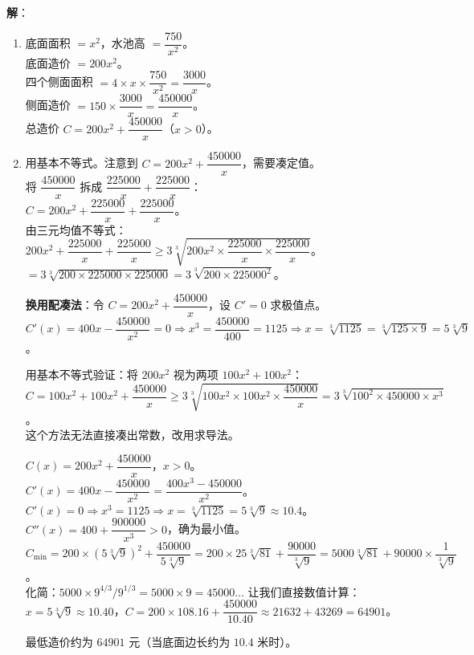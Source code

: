 \documentclass[12pt, a4paper]{ctexart}
\begin{document}
\textbf{解}：
\begin{enumerate}[label=(\arabic*)]
  \item 底面面积 $= x^2$，水池高 $= \dfrac{750}{x^2}$。\\
    底面造价 $= 200x^2$。\\
    四个侧面面积 $= 4 \times x \times \dfrac{750}{x^2} = \dfrac{3000}{x}$。\\
    侧面造价 $= 150 \times \dfrac{3000}{x} = \dfrac{450000}{x}$。\\
    总造价 $C = 200x^2 + \dfrac{450000}{x}$（$x > 0$）。
  \item 用基本不等式。注意到 $C = 200x^2 + \dfrac{450000}{x}$，需要凑定值。\\
    将 $\dfrac{450000}{x}$ 拆成 $\dfrac{225000}{x} + \dfrac{225000}{x}$：\\
    $C = 200x^2 + \dfrac{225000}{x} + \dfrac{225000}{x}$。\\
    由三元均值不等式：$200x^2 + \dfrac{225000}{x} + \dfrac{225000}{x} \geq 3\sqrt[3]{200x^2 \times \dfrac{225000}{x} \times \dfrac{225000}{x}}$。\\
    $= 3\sqrt[3]{200 \times 225000 \times 225000} = 3\sqrt[3]{200 \times 225000^2}$。

    \textbf{换用配凑法}：令 $C = 200x^2 + \dfrac{450000}{x}$，设 $C' = 0$ 求极值点。\\
    $C'(x) = 400x - \dfrac{450000}{x^2} = 0 \Rightarrow x^3 = \dfrac{450000}{400} = 1125 \Rightarrow x = \sqrt[3]{1125} = \sqrt[3]{125 \times 9} = 5\sqrt[3]{9}$。

    用基本不等式验证：将 $200x^2$ 视为两项 $100x^2 + 100x^2$：\\
    $C = 100x^2 + 100x^2 + \dfrac{450000}{x} \geq 3\sqrt[3]{100x^2 \times 100x^2 \times \dfrac{450000}{x}} = 3\sqrt[3]{100^2 \times 450000 \times x^3}$。\\
    这个方法无法直接凑出常数，改用求导法。

    $C(x) = 200x^2 + \dfrac{450000}{x}$，$x > 0$。\\
    $C'(x) = 400x - \dfrac{450000}{x^2} = \dfrac{400x^3 - 450000}{x^2}$。\\
    $C'(x) = 0 \Rightarrow x^3 = 1125 \Rightarrow x = \sqrt[3]{1125} = 5\sqrt[3]{9} \approx 10.4$。\\
    $C''(x) = 400 + \dfrac{900000}{x^3} > 0$，确为最小值。\\
    $C_{\min} = 200 \times (5\sqrt[3]{9})^2 + \dfrac{450000}{5\sqrt[3]{9}} = 200 \times 25\sqrt[3]{81} + \dfrac{90000}{\sqrt[3]{9}} = 5000\sqrt[3]{81} + 90000 \times \dfrac{1}{\sqrt[3]{9}}$。\\
    化简：$5000 \times 9^{4/3}/9^{1/3} = 5000 \times 9 = 45000$... 让我们直接数值计算：\\
    $x = 5\sqrt[3]{9} \approx 10.40$，$C = 200 \times 108.16 + \dfrac{450000}{10.40} \approx 21632 + 43269 = 64901$。

    最低造价约为 $\boxed{64901}$ 元（当底面边长约为 $10.4$ 米时）。
\end{enumerate}
\end{document}
